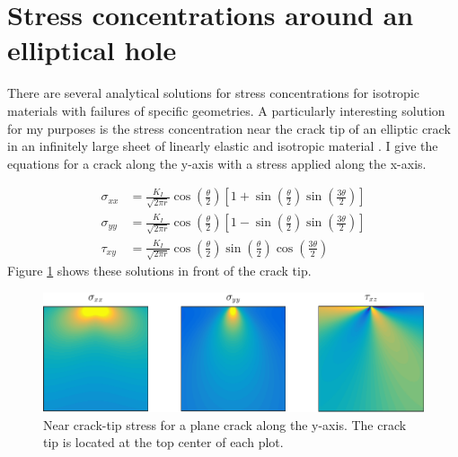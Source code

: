 \section{Stress concentrations around an elliptical hole}
There are several analytical solutions for stress concentrations for isotropic materials with failures of specific geometries. A particularly interesting solution for my purposes is the stress concentration near the crack tip of an elliptic crack in an infinitely large sheet of linearly elastic and isotropic material \cite{Anderson2005}. I give the equations for a crack along the y-axis with a stress applied along the x-axis.

\begin{align}
	\sigma_{xx} & =  \frac{K_I}{\sqrt{2\pi r}} \cos\left(\frac{\theta}{2}\right) \left[ 1+\sin\left(\frac{\theta}{2} \right)\sin\left( \frac{3\theta}{2}\right)\right]\\
	\sigma_{yy} & =  \frac{K_I}{\sqrt{2\pi r}} \cos\left(\frac{\theta}{2}\right) \left[ 1-\sin\left(\frac{\theta}{2} \right)\sin\left( \frac{3\theta}{2}\right)\right]\\	
	\tau_{xy} & =  \frac{K_I}{\sqrt{2\pi r}} \cos\left(\frac{\theta}{2}\right)\sin\left(\frac{\theta}{2} \right)\cos\left( \frac{3\theta}{2}\right)
\end{align}
Figure \ref{fig:analytic_stress} shows these solutions in front of the crack tip.

\begin{figure}
\centering
\includegraphics[width=\textwidth]{../figures/thesis/analytic_stress.pdf}
\caption{Near crack-tip stress for a plane crack along the y-axis. The crack tip is located at the top center of each plot.}
\label{fig:analytic_stress}
\end{figure}


